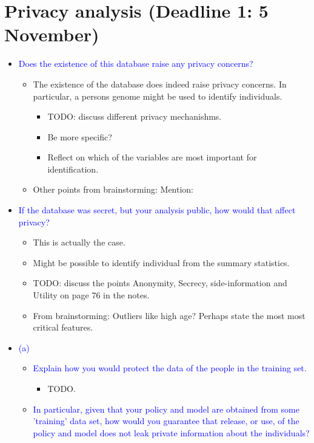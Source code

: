 
\section*{Privacy analysis (Deadline 1: 5 November)}
\begin{itemize}
    \item \textcolor{blue}{Does the existence of this database raise any privacy concerns?}
        \begin{itemize}
            \item The existence of the database does indeed raise privacy concerns. 
            In particular, a persons genome might be used to identify individuals. 
            \begin{itemize}
                \item TODO: discuss different privacy mechanishms. 
                \item Be more specific?
                \item Reflect on which of the variables are most important for identification. 
            \end{itemize}
            \item Other points from brainstorming: Mention: 
        \end{itemize}
    \item \textcolor{blue}{If the database was secret, but your analysis public, how would that affect privacy?}
        \begin{itemize}
            \item This is actually the case. 
            \item Might be possible to identify individual from the summary statistics. 
            \item TODO: discuss the points Anonymity, Secrecy, side-information and Utility on page 76 in the notes. 
            \item From brainstorming: Outliers like high age? Perhaps state the most most critical features. 
        \end{itemize}
    \item \textcolor{blue}{(a)}
        \begin{itemize}
            \item \textcolor{blue}{Explain how you would protect the data of the people in the training set.}
                \begin{itemize}
                    \item TODO. 
                \end{itemize}
            \item \textcolor{blue}{In particular, given that your policy and model are obtained from some 'training' data set, how would you guarantee that release, or use, of the policy and model does not leak private information about the individuals?}

\end{itemize}
\end{itemize}

